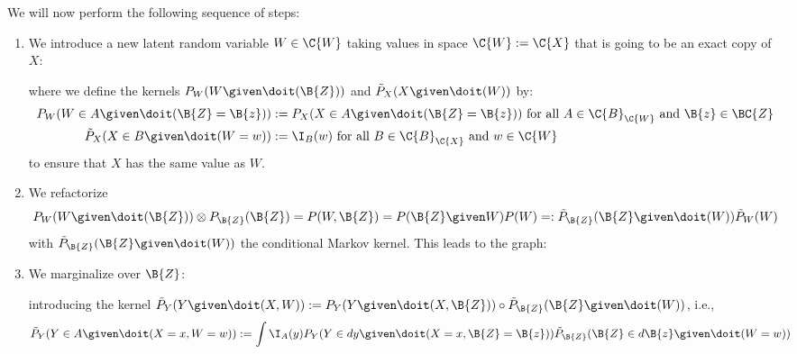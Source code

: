 We will now perform the following sequence of steps:
\begin{enumerate}
  \item We introduce a new latent random variable $W \in \C{W}$ taking values in space $\C{W} := \C{X}$ that is going to be an exact copy of $X$:
\begin{center}\end{center}
where we define the kernels $P_W(W \given \doit(\B{Z}))$ and $\tilde{P}_X(X \given \doit(W))$ by:
\begin{align*}
  P_W(W \in A \given \doit(\B{Z}=\B{z})) & := P_X(X \in A \given \doit(\B{Z}=\B{z})) \text{ for all $A \in \C{B}_{\C{W}}$ and $\B{z}\in\BC{Z}$} \\
  \tilde{P}_X(X \in B \given \doit(W=w)) & := \I_B(w) \text{ for all $B \in \C{B}_{\C{X}}$ and $w \in \C{W}$}
\end{align*}
to ensure that $X$ has the same value as $W$.

\item We refactorize 
$$P_W(W \given \doit(\B{Z})) \otimes P_{\B{Z}}(\B{Z}) = P(W,\B{Z}) = P(\B{Z} \given W) P(W) =: \tilde{P}_{\B{Z}}(\B{Z} \given \doit(W)) \tilde{P}_W(W)$$
with $\tilde{P}_{\B{Z}}(\B{Z} \given \doit(W))$ the conditional Markov kernel. This leads to the graph:
\begin{center}\end{center}

\item We marginalize over $\B{Z}$:
\begin{center}\end{center}
    introducing the kernel $\tilde P_Y(Y \given \doit(X,W)) := P_Y(Y \given \doit(X, \B{Z})) \circ \tilde{P}_{\B{Z}}(\B{Z} \given \doit(W))$, i.e.,
\begin{equation*}\begin{split}
  \tilde P_Y(Y \in A \given \doit(X=x, W=w)) 
  &:= \int \I_A(y) P_Y(Y \in dy \given \doit(X=x, \B{Z}=\B{z})) \tilde{P}_{\B{Z}}(\B{Z} \in d\B{z} \given \doit(W=w))
\end{split}\end{equation*}
\end{enumerate}

